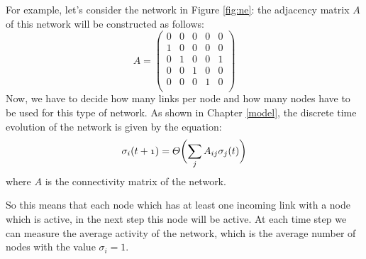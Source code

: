 For example, let's consider the network in Figure \ref{fig:ne}: the adjacency matrix $A$ of this network will be constructed as follows:
$$
A = \left (
\begin{array}{ccccc}

0 & 0 & 0 & 0 & 0  \\
1 & 0 & 0 & 0 & 0  \\
0 & 1 & 0 & 0 & 1  \\
0 & 0 & 1 & 0 & 0  \\
0 & 0 & 0 & 1 & 0  \\

\end{array}
\right )
$$
Now, we have to decide how many links per node and how many nodes have to be used for this type of network. 
As shown in Chapter \ref{model}, the discrete time evolution of the network is given by the equation:
$$
\mathnormal{\sigma_i(t+1)=\Theta\biggl(\sum_jA_{ij}\sigma_j(t)\biggr)}
$$
where $A$ is the connectivity matrix of the network.


So this means that each node which has at least one incoming link with a node which is active, in the next step this node will be active.
At each time step we can measure the average activity of the network, which is the average number of nodes with the value $\sigma_i = 1$.


